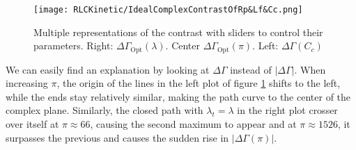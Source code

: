 \documentclass[../main.tex]{subfiles}
\begin{document}
\begin{figure}[t]
\centering
  \texttt{[image: RLCKinetic/IdealComplexContrastOfRp\&Lf\&Cc.png]}
  \caption{Multiple representations of the contrast with sliders to control
  their parameters. Right: \(\Delta\Gamma_{\text{Opt}}(\lambda)\).
  Center \(\Delta\Gamma_{\text{Opt}}(\pi)\). Left: \(\Delta\Gamma(C_{c})\)}
\label{fig:IdealComplexContrast}
\end{figure}

We can easily find an explanation by looking at \(\Delta\Gamma\) instead of
\(|\Delta\Gamma|\). When increasing \(\pi\), the origin of the lines in the
left plot of figure \ref{fig:IdealComplexContrast} shifts to the left, while
the ends stay relatively similar, making the path curve to the center of the
complex plane. Similarly, the closed path with \(\lambda_{t} = \lambda\)
in the right plot crosser over itself at \(\pi \approx 66\), causing the
second maximum to appear and at \(\pi \approx 1526\), it surpasses the previous
and causes the sudden rise in \(|\Delta\Gamma(\pi)|\).
\end{document}
